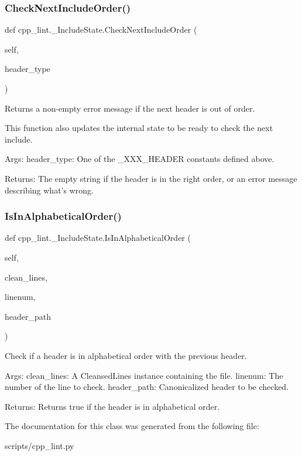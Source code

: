 \subsubsection{\texorpdfstring{Check\+Next\+Include\+Order()}{CheckNextIncludeOrder()}}
{\footnotesize\ttfamily def cpp\+\_\+lint.\+\_\+\+Include\+State.\+Check\+Next\+Include\+Order (\begin{DoxyParamCaption}\item[{}]{self,  }\item[{}]{header\+\_\+type }\end{DoxyParamCaption})}

\begin{DoxyVerb}Returns a non-empty error message if the next header is out of order.

This function also updates the internal state to be ready to check
the next include.

Args:
  header_type: One of the _XXX_HEADER constants defined above.

Returns:
  The empty string if the header is in the right order, or an
  error message describing what's wrong.\end{DoxyVerb}
 \mbox{\label{classcpp__lint_1_1___include_state_a7849c0d95d8f156e7678ff6f76ede724}} 
\subsubsection{\texorpdfstring{Is\+In\+Alphabetical\+Order()}{IsInAlphabeticalOrder()}}
{\footnotesize\ttfamily def cpp\+\_\+lint.\+\_\+\+Include\+State.\+Is\+In\+Alphabetical\+Order (\begin{DoxyParamCaption}\item[{}]{self,  }\item[{}]{clean\+\_\+lines,  }\item[{}]{linenum,  }\item[{}]{header\+\_\+path }\end{DoxyParamCaption})}

\begin{DoxyVerb}Check if a header is in alphabetical order with the previous header.

Args:
  clean_lines: A CleansedLines instance containing the file.
  linenum: The number of the line to check.
  header_path: Canonicalized header to be checked.

Returns:
  Returns true if the header is in alphabetical order.
\end{DoxyVerb}
 

The documentation for this class was generated from the following file\+:\begin{DoxyCompactItemize}
\item 
scripts/cpp\+\_\+lint.\+py\end{DoxyCompactItemize}
